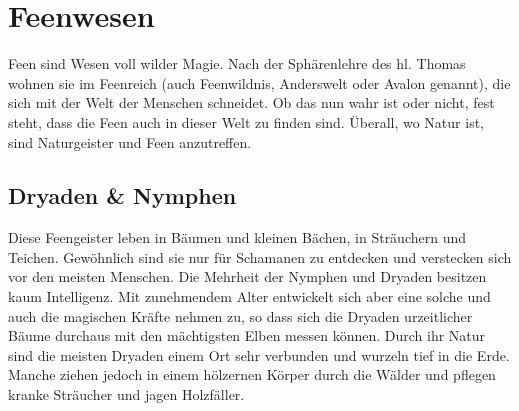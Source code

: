 \documentclass[10pt,twoside,twocolumn,openany]{book}
\begin{document}
%	
%
%	
%	
%
%
%

\section{Feenwesen}
Feen sind Wesen voll wilder Magie. Nach der Sphärenlehre des hl. Thomas wohnen sie im Feenreich (auch Feenwildnis, Anderswelt oder Avalon genannt), die sich mit der Welt der Menschen schneidet. Ob das nun wahr ist oder nicht, fest steht, dass die Feen auch in dieser Welt zu finden sind. Überall, wo Natur ist, sind Naturgeister und Feen anzutreffen.

\subsection{Dryaden \& Nymphen}
Diese Feengeister leben in Bäumen und kleinen Bächen, in Sträuchern und Teichen. Gewöhnlich sind sie nur für Schamanen zu entdecken und verstecken sich vor den meisten Menschen. Die Mehrheit der Nymphen und Dryaden besitzen kaum Intelligenz. Mit zunehmendem Alter entwickelt sich aber eine solche und auch die magischen Kräfte nehmen zu, so dass sich die Dryaden urzeitlicher Bäume durchaus mit den mächtigsten Elben messen können.
Durch ihr Natur sind die meisten Dryaden einem Ort sehr verbunden und wurzeln tief in die Erde. Manche ziehen jedoch in einem hölzernen Körper durch die Wälder und pflegen kranke Sträucher und jagen Holzfäller.
\end{document}
